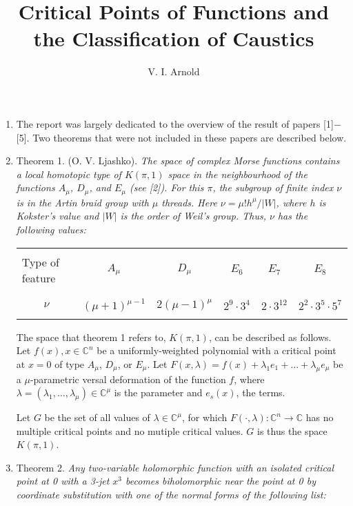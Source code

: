 \documentclass{article}
\begin{document}
\date{}
\author{V. I. Arnold}
\title{Critical Points of Functions and the Classification of Caustics}
\maketitle
\begin{enumerate}
\item
The report was largely dedicated to the overview of the result of papers
[1]$-$[5].
Two theorems that were not included in these papers are described below.
\item
Theorem 1.
(O. V. Ljashko).
\textit{The space of complex Morse functions contains a local homotopic type of
$K(\pi,1)$ space in the neighbourhood of the functions $A_\mu$, $D_\mu$, and
$E_\mu$ (see [2]).
For this $\pi$, the subgroup of finite index $\nu$ is in the Artin braid group
with $\mu$ threads.
Here $\nu=\mu!h^\mu/|W|$, where $h$ is Kokster's value and $|W|$ is the order of
Weil's group.
Thus, $\nu$ has the following values:}

\begin{tabular}[c]{l||c|c|c|c|c}
&&&&&\\Type of feature&$A_\mu$&$D_\mu$&$E_6$&$E_7$&$E_8$\\&&&&&\\\hline&&&&&\\
\multicolumn{1}{c||}{$\nu$}&$(\mu+1)^{\mu-1}$&$2(\mu-1)^\mu$&$2^9\cdot3^4$&
$2\cdot3^12$&$2^2\cdot3^5\cdot5^7$\\&&&&&
\end{tabular}

The space that theorem 1 refers to, $K(\pi,1)$, can be described as follows.
Let $f(x),x\in\mathbb{C}^n$ be a uniformly-weighted polynomial with a critical
point at $x=0$ of type $A_\mu$, $D_\mu$, or $E_\mu$.
Let $F(x,\lambda)=f(x)+\lambda_1e_1+\ldots+\lambda_\mu e_\mu$ be a
$\mu$-parametric versal deformation of the function $f$, where
$\lambda=(\lambda_1,\ldots,\lambda_\mu)\in\mathbb{C}^\mu$ is the parameter and
$e_s(x)$, the terms.

Let $G$ be the set of all values of $\lambda\in\mathbb{C}^\mu$, for which
$F(\cdot,\lambda):\mathbb{C}^n\to\mathbb{C}$ has no multiple critical points and
no mutiple critical values.
$G$ is thus the space $K(\pi,1)$.
\item
Theorem 2.
\textit{Any two-variable holomorphic function with an isolated critical point at
0 with a 3-jet $x^3$ becomes biholomorphic near the point at 0 by coordinate
substitution with one of the normal forms of the following list:}


\end{enumerate}
\end{document}
